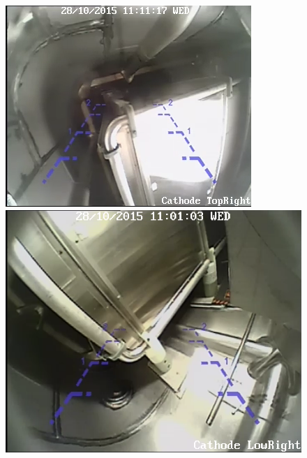 \begin{figure}
  \includegraphics[width=\linewidth]{cathodetr}
 \endminipage
   \includegraphics[width=\linewidth]{cathodelr}
 \endminipage


\end{figure}
